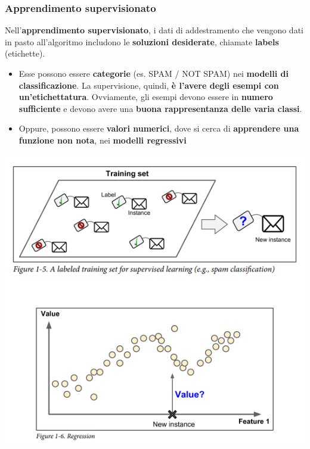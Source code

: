 \documentclass[12pt]{article}
\begin{document}
\subsubsection{Apprendimento supervisionato}
Nell'\textbf{apprendimento supervisionato}, i dati di addestramento che vengono dati in pasto all'algoritmo includono le \textbf{soluzioni desiderate}, chiamate \textbf{labels} (etichette).
\begin{itemize}
    \item Esse possono essere \textbf{categorie} (es. SPAM / NOT SPAM) nei \textbf{modelli di classificazione}. La supervisione, quindi, \textbf{è l'avere degli esempi con un'etichettatura}. Ovviamente, gli esempi devono essere in \textbf{numero sufficiente} e devono avere una \textbf{buona rappresentanza delle varia classi}.
    \item Oppure, possono essere \textbf{valori numerici}, dove si cerca di \textbf{apprendere una funzione non nota}, nei \textbf{modelli regressivi} 
\end{itemize}
\begin{center}
    \includegraphics[width =0.65\linewidth]{Images/60.PNG}
\end{center}
\end{document}
